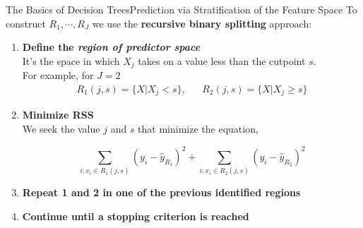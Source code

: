 \begin{frame}{The Basics of Decision Trees}{Prediction via Stratification of the Feature Space}
    To construct $R_1, \cdots, R_J$ we use the \textbf{recursive binary splitting} approach: \pause  

    \begin{enumerate}
        \item \textbf{Define the \textit{region of predictor space}} \\ \pause 
        It's the space in which $X_j$ takes on a value less than the cutpoint $s$. \\ 
        For example, for $J=2$ \\

        \begin{align*}
            R_1 (j,s) = \{X|X_j < s\}, && R_2 (j, s) = \{X|X_j \geq s\}
        \end{align*} \pause 

        \item \textbf{Minimize RSS} \\ \pause 
        We seek the value $j$ and $s$ that minimize the equation, \pause 

        \begin{equation*}
            \sum_{i: x_i \in R_1(j,s)} (y_i - \hat{y}_{R_{1}} )^2 + \sum_{i: x_i \in R_2(j,s)} (y_i - \hat{y}_{R_{2}} )^2
        \end{equation*}

        \item \textbf{Repeat 1 and 2 in one of the previous identified regions} \pause

        \item \textbf{Continue until a stopping
criterion is reached} \\ 

    \end{enumerate}
\end{frame}

